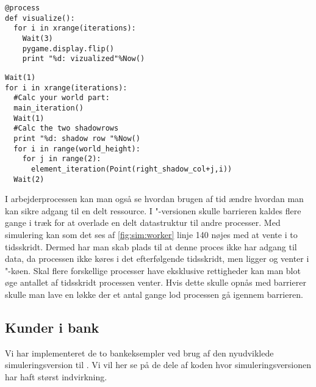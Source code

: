 \begin{lstlisting}[firstnumber=144 ,float=hbtp, label=fig:sim:visualize, caption=\code{simulerings}"-versionen af visualize]
@process
def visualize():
  for i in xrange(iterations):
    Wait(3)  
    pygame.display.flip()
    print "%d: vizualized"%Now()
\end{lstlisting}

\begin{lstlisting}[firstnumber=130 ,float=hbtp, label=fig:sim:worker, caption=Uddrag af arbejderprocessen i simulering]
Wait(1)
for i in xrange(iterations):
  #Calc your world part:
  main_iteration()
  Wait(1)
  #Calc the two shadowrows
  print "%d: shadow row "%Now()
  for i in range(world_height):
    for j in range(2):
      element_iteration(Point(right_shadow_col+j,i))
  Wait(2)
\end{lstlisting}

I arbejderprocessen kan man også se hvordan brugen af tid ændre hvordan man kan sikre adgang til en delt ressource. I  "-versionen skulle barrieren  kaldes flere gange i træk for at overlade en delt datastruktur til andre processer. Med simulering kan som det ses af \cref{fig:sim:worker} linje 140 nøjes med at vente i to tidsskridt. Dermed har man skab plads til at denne proces ikke har adgang til data, da processen ikke køres i det efterfølgende tidsskridt, men ligger og venter i "-køen. Skal flere forskellige processer have eksklusive rettigheder kan man blot øge antallet af tidsskridt processen venter. Hvis dette skulle opnås med barrierer skulle man lave en løkke der et antal gange lod processen gå igennem barrieren.

\subsection{Kunder i bank}
Vi har implementeret de to bankeksempler ved brug af den nyudviklede simuleringsversion til \pycsp. Vi vil her se på de dele af koden hvor simuleringsversionen har haft størst indvirkning. 

